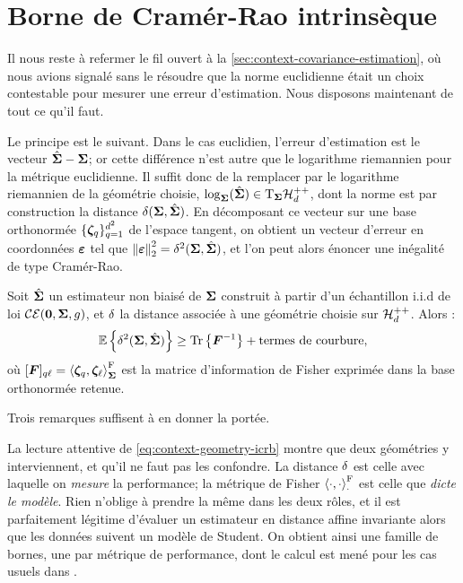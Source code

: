\section{Borne de Cramér-Rao intrinsèque}
\label{sec:context-geometry-icrb}

Il nous reste à refermer le fil ouvert à la \cref{sec:context-covariance-estimation}, où nous avions signalé sans le résoudre que la norme euclidienne était un choix contestable pour mesurer une erreur d'estimation. Nous disposons maintenant de tout ce qu'il faut.

Le principe est le suivant. Dans le cas euclidien, l'erreur d'estimation est le vecteur $\hat{\boldsymbol{\Sigma}}-\boldsymbol{\Sigma}$; or cette différence n'est autre que le logarithme riemannien pour la métrique euclidienne. Il suffit donc de la remplacer par le logarithme riemannien de la géométrie choisie, $\log_{\boldsymbol{\Sigma}}(\hat{\boldsymbol{\Sigma}})\in\mathrm{T}_{\boldsymbol{\Sigma}}\mathcal{H}_{d}^{++}$, dont la norme est par construction la distance $\delta(\boldsymbol{\Sigma},\hat{\boldsymbol{\Sigma}})$. En décomposant ce vecteur sur une base orthonormée $\{\boldsymbol{\zeta}_q\}_{q=1}^{d^2}$ de l'espace tangent, on obtient un vecteur d'erreur en coordonnées $\boldsymbol{\varepsilon}$ tel que $\left\lVert\boldsymbol{\varepsilon}\right\rVert_2^2=\delta^2(\boldsymbol{\Sigma},\hat{\boldsymbol{\Sigma}})$, et l'on peut alors énoncer une inégalité de type Cramér-Rao.

\begin{property}
\label{prop:context-geometry-icrb}
  Soit $\hat{\boldsymbol{\Sigma}}$ un estimateur non biaisé de $\boldsymbol{\Sigma}$ construit à partir d'un échantillon i.i.d de loi $\mathcal{CE}(\boldsymbol{0},\boldsymbol{\Sigma},g)$, et $\delta$ la distance associée à une géométrie choisie sur $\mathcal{H}_{d}^{++}$. Alors :
  \begin{equation}
    \operatorname{\mathbb{E}}\left\{\delta^2(\boldsymbol{\Sigma},\hat{\boldsymbol{\Sigma}})\right\}
    \geq
    \operatorname{\operatorname{Tr}}\left\{{\boldsymbol{F}}^{-1}\right\}
    + \text{termes de courbure},
    \label{eq:context-geometry-icrb}
  \end{equation}
  où $[\boldsymbol{F}]_{q\ell}=\left\langle \boldsymbol{\zeta}_q, \boldsymbol{\zeta}_\ell \right\rangle_{\boldsymbol{\Sigma}}^{\mathrm{F}}$ est la matrice d'information de Fisher exprimée dans la base orthonormée retenue.
\end{property}

Trois remarques suffisent à en donner la portée.

\begin{remark}
  La lecture attentive de \cref{eq:context-geometry-icrb} montre que deux géométries y interviennent, et qu'il ne faut pas les confondre. La distance $\delta$ est celle avec laquelle on \emph{mesure} la performance; la métrique de Fisher $\left\langle \cdot, \cdot \right\rangle_{\cdot}^{\mathrm{F}}$ est celle que \emph{dicte le modèle}. Rien n'oblige à prendre la même dans les deux rôles, et il est parfaitement légitime d'évaluer un estimateur en distance affine invariante alors que les données suivent un modèle de Student. On obtient ainsi une famille de bornes, une par métrique de performance, dont le calcul est mené pour les cas usuels dans .
\end{remark}

